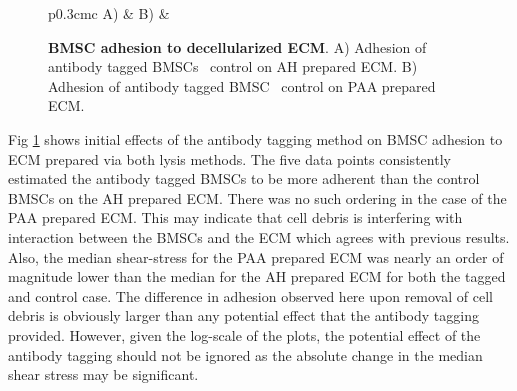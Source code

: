 \begin{figure}[!t]
\centering
\begin{tabular}{p{0.3cm}c}
A) & 
\cr
B) & 
\cr
\end{tabular}
\caption{\textbf{BMSC adhesion to decellularized ECM}. A) Adhesion of antibody tagged BMSCs \vs\ control on AH prepared ECM. B) Adhesion of antibody tagged BMSC \vs\ control on PAA prepared ECM.}
\label{Chap:Cardiac:fig:tagging}
\end{figure}
Fig \ref{Chap:Cardiac:fig:tagging} shows initial effects of the antibody tagging method on BMSC adhesion to ECM prepared via both lysis methods. The five data points consistently estimated the antibody tagged BMSCs to be more adherent than the control BMSCs on the AH prepared ECM. There was no such ordering in the case of the PAA prepared ECM. This may indicate that cell debris is interfering with interaction between the BMSCs and the ECM which agrees with previous results. Also, the median shear-stress for the PAA prepared ECM was nearly an order of magnitude lower than the median for the AH prepared ECM for both the tagged and control case. The difference in adhesion observed here upon removal of cell debris is obviously larger than any potential effect that the antibody tagging provided. However, given the log-scale of the plots, the potential effect of the antibody tagging should not be ignored as the absolute change in the median shear stress may be significant. 

